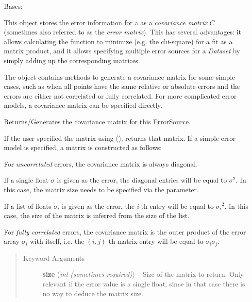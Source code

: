 \documentclass[a4paper,10pt,english]{sphinxmanual}
\begin{document}
\begin{fulllineitems}
\label{module_doc:kafe.dataset.ErrorSource}
Bases: 

This object stores the error information for a  as a
\emph{covariance matrix} \(C\) (sometimes also referred to as the \emph{error
matrix}). This has several advantages: it allows calculating the function
to minimize (e.g. the chi-square) for a fit as a matrix product, and it
allows specifying multiple error sources for a \emph{Dataset} by simply adding
up the corresponding matrices.

The object contains methods to generate a covariance matrix for some
simple cases, such as when all points have the same relative or absolute
errors and the errors are either not correlated or fully correlated. For
more complicated error models, a covariance matrix can be specified
directly.

\begin{fulllineitems}
\label{module_doc:kafe.dataset.ErrorSource.get_matrix}
Returns/Generates the covariance matrix for this ErrorSource.

If the user specified the matrix using
{\hyperref[module_doc:kafe.dataset.ErrorSource.make_from_matrix]{\emph{}}} (),
returns that matrix. If a simple error model is specified, a matrix is
constructed as follows:

For \emph{uncorrelated} errors, the covariance matrix is always diagonal.

If a single float \(\sigma\) is given as the error, the diagonal
entries will be equal to \(\sigma^2\). In this case, the matrix
size needs to be specified via the  parameter.

If a list of floats \(\sigma_i\) is given as the error, the
\emph{i}-th entry will be equal to \({\sigma_i}^2\). In this case,
the size of the matrix is inferred from the size of the list.

For \emph{fully correlated} errors, the covariance matrix is the outer
product of the error array \(\sigma_i\) with itself, i.e. the
\((i,j)\)-th matrix entry will be equal to
\(\sigma_i\sigma_j\).
\begin{quote}\begin{description}
\item[{Keyword Arguments}] \leavevmode
\textbf{size} (\emph{int (sometimes required)}) --
Size of the matrix to return. Only relevant if the error value
is a single float, since in that case there is no way to deduce
the matrix size.


\end{description}
\end{quote}
\end{fulllineitems}
\end{fulllineitems}
\end{document}
